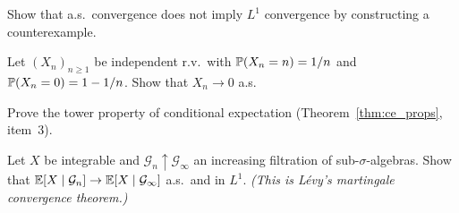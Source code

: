 \begin{exercise}
Show that a.s.\ convergence does not imply $L^1$ convergence by constructing
a counterexample.
\end{exercise}

\begin{exercise}
Let $(X_n)_{n \geq 1}$ be independent r.v.\ with
$\mathbb{P}(X_n = n) = 1/n$ and $\mathbb{P}(X_n = 0) = 1 - 1/n$. Show that $X_n \to 0$ a.s.
\end{exercise}

\begin{exercise}
Prove the tower property of conditional expectation
(Theorem~\ref{thm:ce_props}, item~3).
\end{exercise}

\begin{exercise}
Let $X$ be integrable and $\mathcal{G}_n \uparrow \mathcal{G}_{\infty}$ an
increasing filtration of sub-$\sigma$-algebras. Show that
$\mathbb{E}[X \mid \mathcal{G}_n] \to \mathbb{E}[X \mid \mathcal{G}_{\infty}]$ a.s.\ and in $L^1$.
\emph{(This is L\'evy's martingale convergence theorem.)}
\end{exercise}
